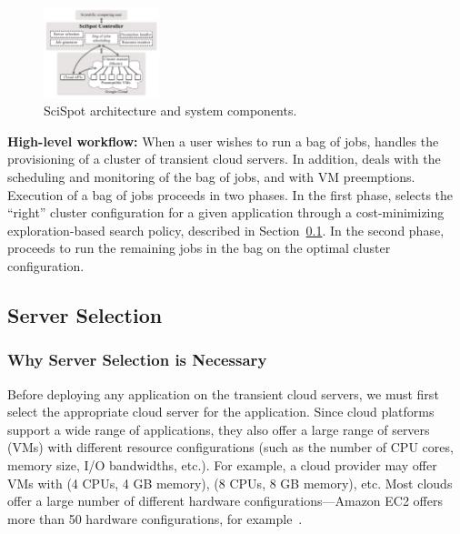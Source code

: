 \begin{figure}[t]
  \includegraphics[width=0.3\textwidth]{../figures/Architecture.png}
\vspace*{\myfigspace}
  \caption{SciSpot architecture and system components.}
  \label{fig:arch}
  \vspace*{\myfigspace}
\end{figure}


\noindent \textbf{High-level workflow:} When a user wishes to run a bag of jobs, \sysname handles the provisioning of a cluster of transient cloud servers.
In addition, \sysname deals with the scheduling and monitoring of the bag of jobs, and with VM preemptions. 
Execution of a bag of jobs proceeds in two phases.
In the first phase, \sysname selects the ``right'' cluster configuration for a given application through a cost-minimizing exploration-based search policy, described in Section~\ref{subsec:server-selection}. 
In the second phase, \sysname proceeds to run the remaining jobs in the bag on the optimal cluster configuration. 

\subsection{Server Selection}
\label{subsec:server-selection}

\subsubsection{Why Server Selection is Necessary}

Before deploying any application on the transient cloud servers, we must first select the appropriate cloud server for the application. 
Since cloud platforms support a wide range of applications, they also offer a large range of servers (VMs) with different resource configurations (such as the number of CPU cores, memory size, I/O bandwidths, etc.). 
For example, a cloud provider may offer VMs with (4 CPUs, 4 GB memory), (8 CPUs, 8 GB memory), etc.
Most clouds offer a large number of different hardware configurations---Amazon EC2 offers more than 50 hardware configurations, for example~\cite{amazon-ec2-instance-types}. 

